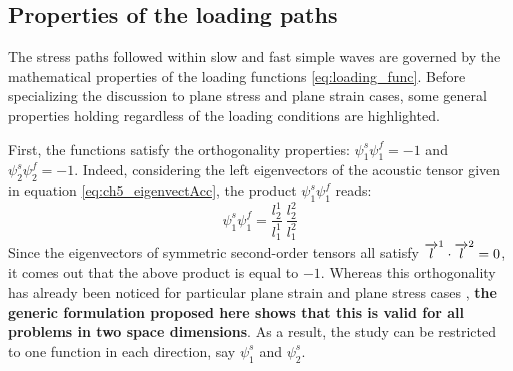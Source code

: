 
\subsection{Properties of the loading paths}
The stress paths followed within slow and fast simple waves are governed by the mathematical properties of the loading functions \eqref{eq:loading_func}.
Before specializing the discussion to plane stress and plane strain cases, some general properties holding regardless of the loading conditions are highlighted.

First, the functions satisfy the orthogonality properties: $\psi^s_1\psi^f_1=-1$ and $\psi^s_2\psi^f_2=-1$.
Indeed, considering the left eigenvectors of the acoustic tensor given in equation \eqref{eq:ch5_eigenvectAcc}, the product $\psi^s_1\psi^f_1$ reads:
\begin{equation*}
  \psi^s_1\psi^f_1 = \frac{l^1_2}{l^1_1}\: \frac{l_2^2}{l^2_1}  
\end{equation*}
Since the eigenvectors of symmetric second-order tensors all satisfy ${\overrightarrow{l}}^1 \cdot {\overrightarrow{l}}^2=0$, it comes out that the above product is equal to $-1$.
Whereas this orthogonality has already been noticed for particular plane strain and plane stress cases \cite{Clifton,Ting68}, \textbf{the generic formulation proposed here shows that this is valid for all problems in two space dimensions}. 
As a result, the study can be restricted to one function in each direction, say $\psi_1^s$ and $\psi_2^s$.

